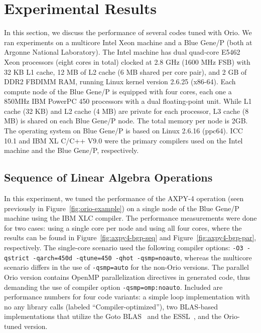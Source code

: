 \section{Experimental Results} 
\label{sec:results} 
 
In this section, we discuss the performance of several codes tuned with
Orio. We ran experiments on a multicore Intel Xeon machine and a Blue Gene/P
(both at Argonne National Laboratory). The Intel machine has dual quad-core
E5462 Xeon processors (eight cores in total) clocked at 2.8 GHz (1600 MHz
FSB) with 32 KB L1 cache, 12 MB of L2 cache (6 MB shared per core pair), and
2 GB of DDR2 FBDIMM RAM, running Linux kernel version 2.6.25 (x86-64). Each
compute node of the Blue Gene/P is equipped with four cores, each one a
850MHz IBM PowerPC 450 processors with a dual floating-point unit. While L1
cache (32 KB) and L2 cache (4 MB) are private for each processor, L3 cache (8
MB) is shared on each Blue Gene/P node. The total memory per node is 2GB. The
operating system on Blue Gene/P is based on Linux 2.6.16 (ppc64). ICC 10.1
and IBM XL C/C++ V9.0 were the primary compilers used on the Intel machine
and the Blue Gene/P, respectively.

\subsection{Sequence of Linear Algebra Operations} 
\label{sec:axpy4-results}
 
In this experiment, we tuned the performance of the AXPY-4 operation
(seen previously in Figure~\ref{fig:orio-example}) on a single node of
the Blue Gene/P machine using the IBM XLC compiler.  The performance
measurements were done for two cases: using a single core per node and using
all four cores, where the results can be found in
Figure~\ref{fig:axpy4-bgp-seq} and Figure~\ref{fig:axpy4-bgp-par},
respectively. The single-core scenario used the following compiler
options: \texttt{-O3 -qstrict -qarch=450d -qtune=450 -qhot
-qsmp=noauto}, whereas the multicore scenario differs in the use of
\texttt{-qsmp=auto} for the non-Orio versions. The parallel Orio
version contains OpenMP parallelization directives in generated code,
thus demanding the use of compiler option
\texttt{-qsmp=omp:noauto}. Included are performance numbers for four
code variants: a simple loop implementation with no any library calls
(labeled ``Compiler-optimized''), two BLAS-based implementations that
utilize the Goto BLAS~\cite{Goto:2006fk,Goto:fk} and the
ESSL~\cite{ESSL}, and the Orio-tuned version.

